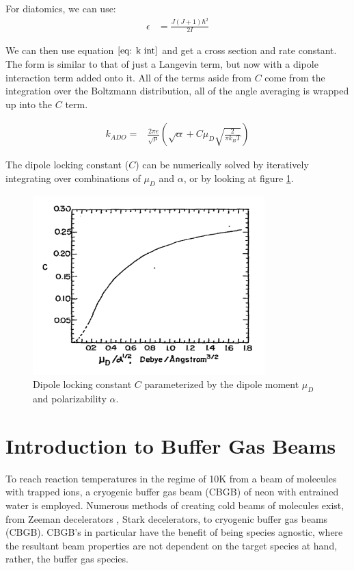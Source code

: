 For diatomics, we can use:
\begin{align*}
    \epsilon & = \frac{J(J+1)\hbar^2}{2I}
\end{align*}

We can then use equation $\ref{eq: k int}$ and get a cross section and rate constant. The form is similar to that of just a Langevin term, but now with a dipole interaction term added onto it. All of the terms aside from $C$ come from the integration over the Boltzmann distribution, all of the angle averaging is wrapped up into the $C$ term.

\begin{align}
    k_{ADO} = & \frac{2 \pi e}{\sqrt{\mu}}\left(\sqrt{\alpha}+C \mu_D\sqrt{\frac{2}{\pi k_B T}}\right)
\end{align}

The dipole locking constant ($C$) can be numerically solved by iteratively integrating over combinations of $\mu_D$ and $\alpha$, or by looking at figure \ref{fig: C}.\cite{Su1973}\cite{Troe1985}

\begin{figure}[H]
\label{fig: C}
\centering
\includegraphics[width=0.8\textwidth]{images/ADO_C.pdf}
\caption{Dipole locking constant $C$ parameterized by the dipole moment $\mu_D$ and polarizability $\alpha$.\cite{Su1973}}
\end{figure}

\section{Introduction to Buffer Gas Beams}

To reach reaction temperatures in the regime of 10K from a beam of molecules with trapped ions, a cryogenic buffer gas beam (CBGB) of neon with entrained water is employed. Numerous methods of creating cold beams of molecules exist, from Zeeman decelerators \cite{Narevicius2008}, Stark decelerators, to cryogenic buffer gas beams (CBGB). CBGB's in particular have the benefit of being species agnostic, where the resultant beam properties are not dependent on the target species at hand, rather, the buffer gas species. 

